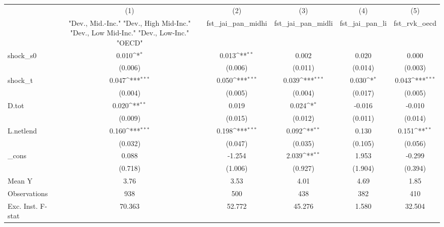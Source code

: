 {
\def\sym#1{\ifmmode^{#1}\else\(^{#1}\)\fi}
\begin{tabular}{l*{5}{c}}
\toprule
            &\multicolumn{1}{c}{(1)}&\multicolumn{1}{c}{(2)}&\multicolumn{1}{c}{(3)}&\multicolumn{1}{c}{(4)}&\multicolumn{1}{c}{(5)}\\
            &\multicolumn{1}{c}{ "Dev., Mid.-Inc." "Dev., High Mid-Inc." "Dev., Low Mid-Inc." "Dev., Low-Inc." "OECD" }&\multicolumn{1}{c}{fst\_jai\_pan\_midhi}&\multicolumn{1}{c}{fst\_jai\_pan\_midli}&\multicolumn{1}{c}{fst\_jai\_pan\_li}&\multicolumn{1}{c}{fst\_rvk\_oecd}\\
\midrule
shock\_s0    &       0.010\sym{*}  &       0.013\sym{**} &       0.002         &       0.020         &       0.000         \\
            &     (0.006)         &     (0.006)         &     (0.011)         &     (0.014)         &     (0.003)         \\
\addlinespace
shock\_t     &       0.047\sym{***}&       0.050\sym{***}&       0.039\sym{***}&       0.030\sym{*}  &       0.043\sym{***}\\
            &     (0.004)         &     (0.005)         &     (0.004)         &     (0.017)         &     (0.005)         \\
\addlinespace
D.tot       &       0.020\sym{**} &       0.019         &       0.024\sym{*}  &      -0.016         &      -0.010         \\
            &     (0.009)         &     (0.015)         &     (0.012)         &     (0.011)         &     (0.014)         \\
\addlinespace
L.netlend   &       0.160\sym{***}&       0.198\sym{***}&       0.092\sym{**} &       0.130         &       0.151\sym{**} \\
            &     (0.032)         &     (0.047)         &     (0.035)         &     (0.105)         &     (0.056)         \\
\addlinespace
\_cons      &       0.088         &      -1.254         &       2.039\sym{**} &       1.953         &      -0.299         \\
            &     (0.718)         &     (1.006)         &     (0.927)         &     (1.904)         &     (0.394)         \\
\midrule
Mean Y      &        3.76         &        3.53         &        4.01         &        4.69         &        1.85         \\
Observations&         938         &         500         &         438         &         382         &         410         \\
Exc. Inst. F-stat&      70.363         &      52.772         &      45.276         &       1.580         &      32.504         \\
\bottomrule
\end{tabular}
}
